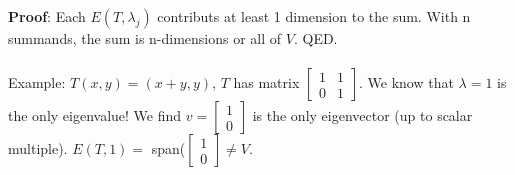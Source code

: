 \documentclass{article}
\begin{document}
\textbf{Proof}: Each $E(T, \lambda_j)$ contributs at least 1 dimension to the sum. With n summands, the sum is n-dimensions or all of $V$. QED. \\\\
Example: $T(x,y) = (x+y, y)$, $T$ has matrix $\begin{bmatrix} 1&1\\0&1\end{bmatrix}$. We know that $\lambda = 1$ is the only eigenvalue! We find $v = \begin{bmatrix}
    1\\0
\end{bmatrix}$ is the only eigenvector (up to scalar multiple). $E(T,1) =$ span($\begin{bmatrix}
    1\\0
\end{bmatrix} \neq V$. \\\\
\end{document}
